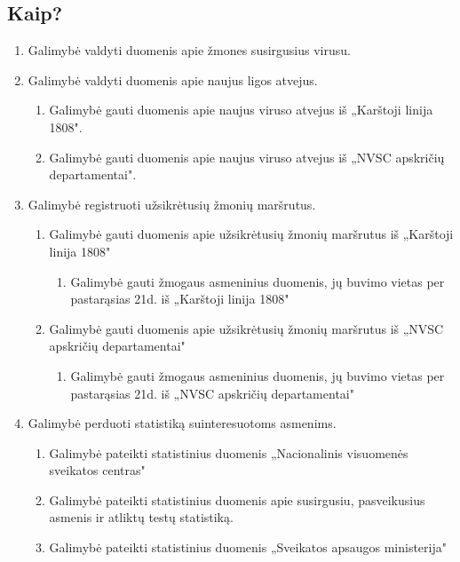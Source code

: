 \documentclass{VUMIFPSkursinis}
\begin{document}
\subsection{Kaip?}\label{sec:versloReqHow}
\begin{enumerate}
	\item{Galimybė valdyti duomenis apie žmones susirgusius virusu.}
	\item{Galimybė valdyti duomenis apie naujus ligos atvejus.}
	      \begin{enumerate}
		      \item{Galimybė gauti duomenis apie naujus viruso atvejus iš „Karštoji linija 1808".}
		      \item{Galimybė gauti duomenis apie naujus viruso atvejus iš „NVSC apskričių departamentai".}
	      \end{enumerate}
	\item{Galimybė registruoti užsikrėtusių žmonių maršrutus.}
	      \begin{enumerate}
		      \item{Galimybė gauti duomenis apie užsikrėtusių žmonių maršrutus iš „Karštoji linija 1808"}
		            \begin{enumerate}
			            \item{Galimybė gauti žmogaus asmeninius duomenis, jų buvimo vietas per pastarąsias 21d. iš „Karštoji linija 1808" }
		            \end{enumerate}
		      \item{Galimybė gauti duomenis apie užsikrėtusių žmonių maršrutus iš „NVSC apskričių departamentai"}
		            \begin{enumerate}
			            \item{Galimybė gauti žmogaus asmeninius duomenis, jų buvimo vietas per pastarąsias 21d. iš „NVSC apskričių departamentai" }
		            \end{enumerate}
	      \end{enumerate}
	\item{Galimybė perduoti statistiką suinteresuotoms asmenims.}
	      \begin{enumerate}
		      \item{Galimybė pateikti statistinius duomenis „Nacionalinis visuomenės sveikatos centras"}
		      \item{Galimybė pateikti statistinius duomenis apie susirgusiu, pasveikusius asmenis ir atliktų testų statistiką.}
		      \item{Galimybė pateikti statistinius duomenis „Sveikatos apsaugos ministerija"}

\end{enumerate}
\end{enumerate}
\end{document}
